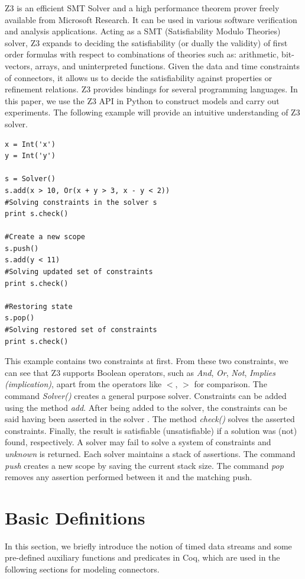 \documentclass[3p,times]{elsarticle}
\begin{document}
Z3\cite{MouraB08} is an efficient SMT Solver and a high performance theorem prover freely available from Microsoft Research. It can be used in various software verification and analysis applications. Acting as a SMT (Satisfiability Modulo Theories) solver, Z3 expands to deciding the satisfiability (or dually the validity) of first order formulas with respect to combinations of theories such as: arithmetic, bit-vectors, arrays, and uninterpreted functions. Given the data and time constraints of connectors, it allows us to decide the satisfiability against properties or refinement relations. Z3 provides bindings for several programming languages. In this paper, we use the Z3 API in Python to construct models and carry out experiments. The following example will provide an intuitive understanding of Z3 solver.
\begin{lstlisting}[frame=single]
x = Int('x')
y = Int('y')

s = Solver()
s.add(x > 10, Or(x + y > 3, x - y < 2))
#Solving constraints in the solver s
print s.check()

#Create a new scope
s.push()
s.add(y < 11)
#Solving updated set of constraints
print s.check()

#Restoring state
s.pop()
#Solving restored set of constraints
print s.check()
\end{lstlisting}
This example contains two constraints at first. From these two constraints, we can see that Z3 supports Boolean operators, such as \emph{And}, \emph{Or}, \emph{Not}, \emph{Implies (implication)}, apart from the operators like $<$, $>$ for comparison.
The command \emph{Solver()} creates a general purpose solver. Constraints can be added using the method \emph{add}. After being added to the solver, the constraints can be said having been asserted in the solver . The method \emph{check()} solves the asserted constraints. Finally, the result is satisfiable (unsatisfiable) if a solution was (not) found, respectively. A solver may fail to solve a system of constraints and \emph{unknown} is returned. Each solver maintains a stack of assertions. The command \emph{push} creates a new scope by saving the current stack size. The command \emph{pop} removes any assertion performed between it and the matching push.
\section{Basic Definitions}\label{sec:basicdef}

In this section, we briefly introduce the notion of timed data streams and some pre-defined auxiliary functions and predicates in Coq, which are used in the following sections for modeling connectors.
\end{document}
